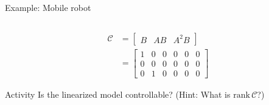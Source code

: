 \documentclass[presentation,aspectratio=169]{beamer}
\begin{document}
\begin{frame}[label={sec:org5256b71}]{Example: Mobile robot}
\begin{columns}
\begin{column}{0.6\columnwidth}
\pause

\begin{align*} \mathcal{C} &= \begin{bmatrix} B & AB & A^2B \end{bmatrix}\\
&= \begin{bmatrix} 1 & 0 & 0 & 0 & 0 & 0 \\ 0 & 0 & 0 & 0 & 0 & 0\\ 0 & 1 & 0 & 0 & 0 & 0\end{bmatrix}
\end{align*}

\pause

\alert{Activity} Is the linearized model controllable? (Hint: What is \(\text{rank}\, \mathcal{C}\)?)
\end{column}
\end{columns}
\end{frame}
\end{document}
